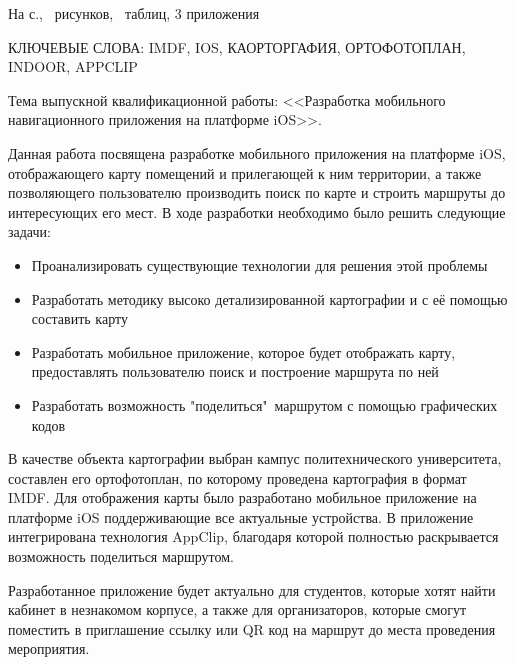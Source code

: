 \noindent На \pageref{LastPage} с., \totalfigures\ рисунков, \totaltables\ таблиц, 3 приложения

\MakeUppercase{
  ключевые слова: imdf, ios, каорторгафия, ортофотоплан, indoor, appclip
}

Тема выпускной квалификационной работы: <<Разработка мобильного навигационного приложения на платформе iOS>>.

Данная работа посвящена разработке мобильного приложения на платформе iOS, отображающего карту помещений и прилегающей к ним территории, а также позволяющего пользователю производить поиск по карте и строить маршруты до интересующих его мест.
В ходе разработки необходимо было решить следующие задачи:
\begin{itemize}
  \item Проанализировать существующие технологии для решения этой проблемы
  \item Разработать методику высоко детализированной картографии и с её помощью составить карту
  \item Разработать мобильное приложение, которое будет отображать карту, предоставлять пользователю поиск и построение маршрута по ней
  \item Разработать возможность "поделиться"\ маршрутом с помощью графических кодов
\end{itemize}

В качестве объекта картографии выбран кампус политехнического университета, составлен его ортофотоплан, по которому проведена картография в формат IMDF. Для отображения карты было разработано мобильное приложение на платформе iOS поддерживающие все актуальные устройства. В приложение интегрирована технология AppClip, благодаря которой полностью раскрывается возможность поделиться маршрутом.

Разработанное приложение будет актуально для студентов, которые хотят найти кабинет в незнакомом корпусе, а также для организаторов, которые смогут поместить в приглашение ссылку или QR код на маршрут до места проведения мероприятия.
